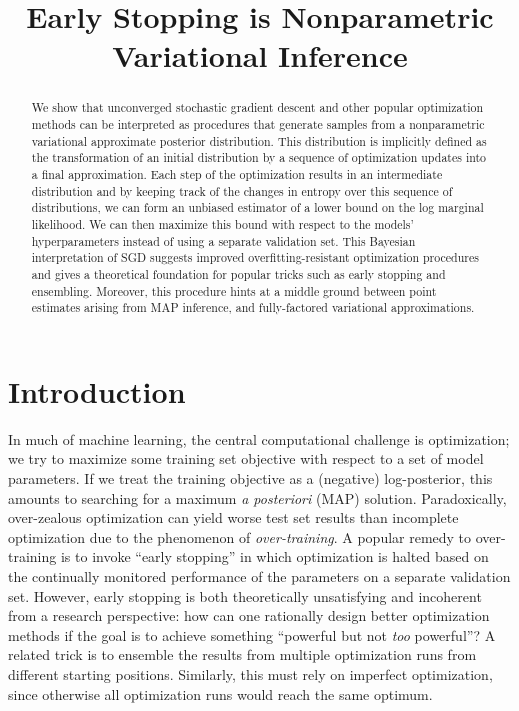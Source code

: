 \documentclass[]{article}
\title{Early Stopping is Nonparametric Variational Inference}
\author{} %
\begin{document}
\maketitle

\begin{abstract}
We show that unconverged stochastic gradient descent and other popular optimization methods can be interpreted as procedures that generate samples from a nonparametric variational approximate posterior distribution.
This distribution is implicitly defined as the transformation of an initial distribution by a sequence of optimization updates into a final approximation.
Each step of the optimization results in an intermediate distribution and by keeping track of the changes in entropy over this sequence of distributions, we can form an unbiased estimator of a lower bound on the log marginal likelihood.
We can then maximize this bound with respect to the models' hyperparameters instead of using a separate validation set.
This Bayesian interpretation of SGD suggests improved overfitting-resistant optimization procedures and gives a theoretical foundation for popular tricks such as early stopping and ensembling.
Moreover, this procedure hints at a middle ground between point estimates arising from MAP inference, and fully-factored variational approximations.
\end{abstract}

\section{Introduction}

In much of machine learning, the central computational challenge is optimization; we try to maximize some training set objective with respect to a set of model parameters.
If we treat the training objective as a (negative) log-posterior, this amounts to searching for a maximum \emph{a posteriori} (MAP) solution.
Paradoxically, over-zealous optimization can yield worse test set results than incomplete optimization due to the phenomenon of \emph{over-training}.
A popular remedy to over-training is to invoke ``early stopping'' in which optimization is halted based on the continually monitored performance of the parameters on a separate validation set.
However, early stopping is both theoretically unsatisfying and incoherent from a research perspective: how can one rationally design better optimization methods if the goal is to achieve something ``powerful but not \emph{too} powerful''?
A related trick is to ensemble the results from multiple optimization runs from different starting positions.
Similarly, this must rely on imperfect optimization, since otherwise all optimization runs would reach the same optimum.
\end{document}
